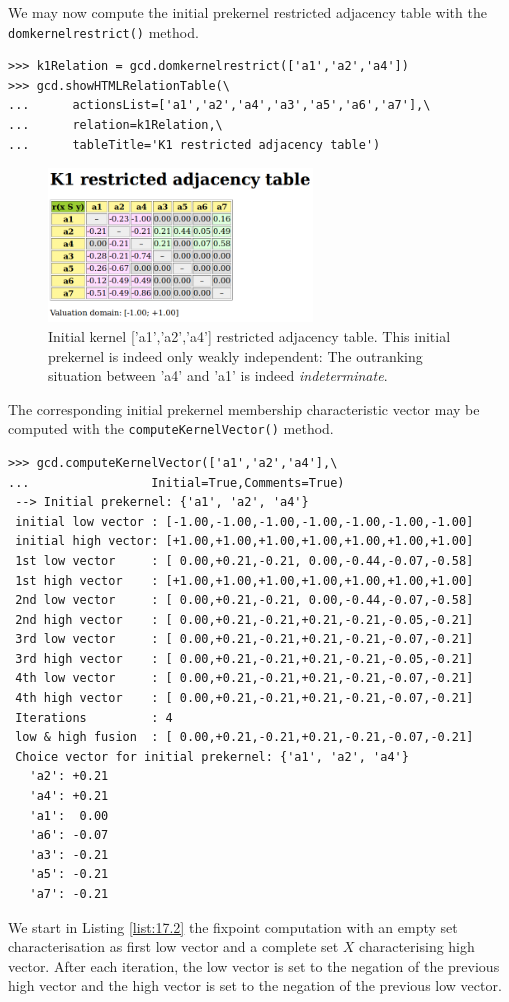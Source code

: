 We may now compute the initial prekernel restricted adjacency table with the \texttt{domkernelrestrict()} method.
\begin{lstlisting}
>>> k1Relation = gcd.domkernelrestrict(['a1','a2','a4'])
>>> gcd.showHTMLRelationTable(\
...      actionsList=['a1','a2','a4','a3','a5','a6','a7'],\
...      relation=k1Relation,\
...      tableTitle='K1 restricted adjacency table')
\end{lstlisting}
\begin{figure}[h]
\sidecaption
\includegraphics[width=7cm]{Figures/k1restricted.png}
\caption{Initial kernel ['a1','a2','a4'] restricted adjacency table. This initial prekernel is indeed only weakly independent: The outranking situation between 'a4' and 'a1' is indeed \emph{indeterminate}. }
\label{fig:17.10}       %
\end{figure}

The corresponding initial prekernel membership characteristic vector may be computed with the \texttt{computeKernelVector()} method.
\begin{lstlisting}[caption={Fixpoint iterations for initial prekernel ['a1','a2','a4']},label=list:17.2]
>>> gcd.computeKernelVector(['a1','a2','a4'],\
...                 Initial=True,Comments=True)
 --> Initial prekernel: {'a1', 'a2', 'a4'}
 initial low vector : [-1.00,-1.00,-1.00,-1.00,-1.00,-1.00,-1.00]
 initial high vector: [+1.00,+1.00,+1.00,+1.00,+1.00,+1.00,+1.00]
 1st low vector     : [ 0.00,+0.21,-0.21, 0.00,-0.44,-0.07,-0.58]
 1st high vector    : [+1.00,+1.00,+1.00,+1.00,+1.00,+1.00,+1.00]
 2nd low vector     : [ 0.00,+0.21,-0.21, 0.00,-0.44,-0.07,-0.58]
 2nd high vector    : [ 0.00,+0.21,-0.21,+0.21,-0.21,-0.05,-0.21]
 3rd low vector     : [ 0.00,+0.21,-0.21,+0.21,-0.21,-0.07,-0.21]
 3rd high vector    : [ 0.00,+0.21,-0.21,+0.21,-0.21,-0.05,-0.21]
 4th low vector     : [ 0.00,+0.21,-0.21,+0.21,-0.21,-0.07,-0.21]
 4th high vector    : [ 0.00,+0.21,-0.21,+0.21,-0.21,-0.07,-0.21]
 Iterations         : 4
 low & high fusion  : [ 0.00,+0.21,-0.21,+0.21,-0.21,-0.07,-0.21]
 Choice vector for initial prekernel: {'a1', 'a2', 'a4'}
   'a2': +0.21
   'a4': +0.21
   'a1':  0.00
   'a6': -0.07
   'a3': -0.21
   'a5': -0.21
   'a7': -0.21
\end{lstlisting}
We start in Listing \ref{list:17.2} the fixpoint computation with an empty set characterisation as first low vector and a complete set $X$ characterising high vector. After each iteration, the low vector is set to the negation of the previous high vector and the high vector is set to the negation of the previous low vector.

